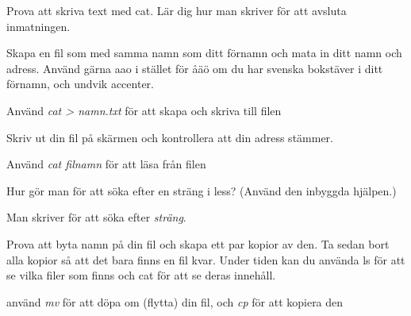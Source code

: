\documentclass[a4paper,twocolumn]{book}
\begin{document}
\begin{exercise}
  Prova att skriva text med cat. Lär dig hur man
  skriver  för att avsluta inmatningen.
\end{exercise}

\begin{exercise}
  Skapa en fil som med samma namn som ditt förnamn och mata in ditt
  namn och adress. Använd gärna aao i stället för åäö om du har svenska
  bokstäver i ditt förnamn, och undvik accenter.
  \begin{answer}
    Använd \emph{cat > namn.txt} för att skapa och skriva till filen
  \end{answer}
\end{exercise}

\begin{exercise}
  Skriv ut din fil på skärmen och kontrollera att din adress stämmer.
  \begin{answer}
    Använd \emph{cat filnamn} för att läsa från filen
  \end{answer}
\end{exercise}


\begin{exercise}
  Hur gör man för att söka efter en sträng i less? (Använd den inbyggda
  hjälpen.)
  \begin{answer}
    Man skriver  för att söka efter \emph{sträng}.
  \end{answer}
\end{exercise}

\begin{exercise}
  Prova att byta namn på din fil och skapa ett par kopior av den. Ta
  sedan bort alla kopior så att det bara finns en fil kvar. Under
  tiden kan du använda ls för att se vilka filer som finns och cat för
  att se deras innehåll.
  \begin{answer}
    använd \emph{mv} för att döpa om (flytta) din fil, och \emph{cp} för att kopiera den
  \end{answer}
\end{exercise}
\end{document}
